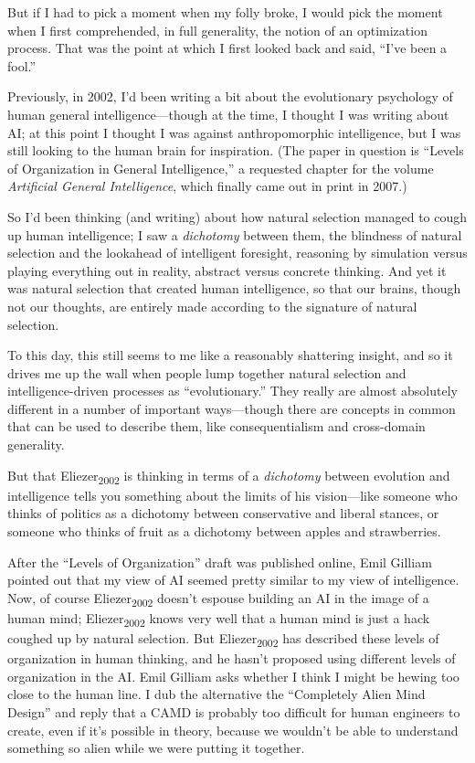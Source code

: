 {
 But if I had to pick a moment when my folly broke, I would pick
the moment when I first comprehended, in full generality, the notion of
an optimization process. That was the point at which I first looked
back and said, ``I've been a
fool.''}

{
 Previously, in 2002, I'd been writing a bit about
the evolutionary psychology of human general intelligence---though at
the time, I thought I was writing about AI; at this point I thought I
was against anthropomorphic intelligence, but I was still looking to
the human brain for inspiration. (The paper in question is
``Levels of Organization in General
Intelligence,'' a requested chapter for the volume
\textit{Artificial General Intelligence}, which
finally came out in print in 2007.)}

{
 So I'd been thinking (and writing) about how
natural selection managed to cough up human intelligence; I saw a
\textit{dichotomy} between them, the blindness of natural selection and
the lookahead of intelligent foresight, reasoning by simulation versus
playing everything out in reality, abstract versus concrete thinking.
And yet it was natural selection that created human intelligence, so
that our brains, though not our thoughts, are entirely made according
to the signature of natural selection.}

{
 To this day, this still seems to me like a reasonably shattering
insight, and so it drives me up the wall when people lump together
natural selection and intelligence-driven processes as
``evolutionary.'' They really are
almost absolutely different in a number of important ways---though
there are concepts in common that can be used to describe them, like
consequentialism and cross-domain generality.}

{
 But that Eliezer\textsubscript{2002} is thinking in terms of a
\textit{dichotomy} between evolution and intelligence tells you
something about the limits of his vision---like someone who thinks of
politics as a dichotomy between conservative and liberal stances, or
someone who thinks of fruit as a dichotomy between apples and
strawberries.}

{
 After the ``Levels of
Organization'' draft was published online, Emil
Gilliam pointed out that my view of AI seemed pretty similar to my view
of intelligence. Now, of course Eliezer\textsubscript{2002}
doesn't espouse building an AI in the image of a human
mind; Eliezer\textsubscript{2002} knows very well that a human mind is
just a hack coughed up by natural selection. But
Eliezer\textsubscript{2002} has described these levels of organization
in human thinking, and he hasn't proposed using
different levels of organization in the AI. Emil Gilliam asks whether I
think I might be hewing too close to the human line. I dub the
alternative the ``Completely Alien Mind
Design'' and reply that a CAMD is probably too
difficult for human engineers to create, even if it's
possible in theory, because we wouldn't be able to
understand something so alien while we were putting it together.}

